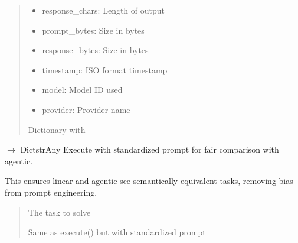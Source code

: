 \documentclass[letterpaper,10pt,english]{sphinxmanual}
\begin{document}
\begin{fulllineitems}
\begin{fulllineitems}
\begin{quote}
\begin{description}
\begin{itemize}
\item {} 
\sphinxAtStartPar
response\_chars: Length of output

\item {} 
\sphinxAtStartPar
prompt\_bytes: Size in bytes

\item {} 
\sphinxAtStartPar
response\_bytes: Size in bytes

\item {} 
\sphinxAtStartPar
timestamp: ISO format timestamp

\item {} 
\sphinxAtStartPar
model: Model ID used

\item {} 
\sphinxAtStartPar
provider: Provider name

\end{itemize}


\sphinxAtStartPar
Dictionary with

\end{description}\end{quote}

\end{fulllineitems}


\begin{fulllineitems}
\label{\detokenize{core.execution.linear:core.execution.linear.LinearExecutor.execute_comparison}}
\pysigstartsignatures
\pysiglinewithargsret
{}
{}
{{ $\rightarrow$ Dict\DUrole{p}{{[}}strAny\DUrole{p}{{]}}}}
\pysigstopsignatures
\sphinxAtStartPar
Execute with standardized prompt for fair comparison with agentic.

\sphinxAtStartPar
This ensures linear and agentic see semantically equivalent tasks,
removing bias from prompt engineering.
\begin{quote}\begin{description}
\sphinxAtStartPar
{} \textendash{} The task to solve

\sphinxAtStartPar
Same as execute() but with standardized prompt

\end{description}\end{quote}

\end{fulllineitems}


\end{fulllineitems}
\end{document}
